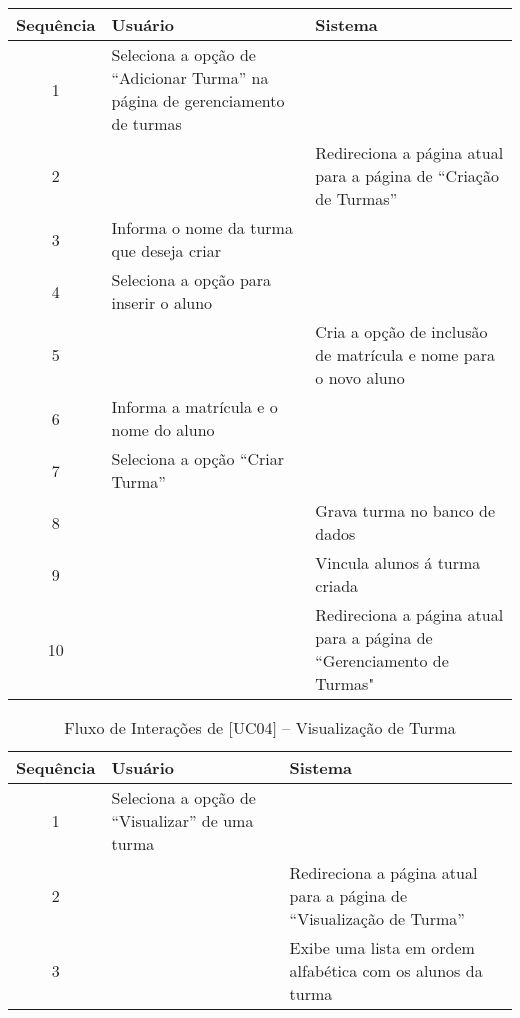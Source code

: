 \begin{itemize}
\begin{itemize}
\begin{table}[H]
\begin{tabular}{c|p{6cm}|p{6cm}}
                \textbf{Sequência} & \textbf{Usuário} & \textbf{Sistema} \\ %
                \hline                               %
                1 & Seleciona a opção de “Adicionar Turma” na página de gerenciamento de turmas  &  \\
                2 &   & Redireciona a página atual para a página de “Criação de Turmas”  \\
                3 & Informa o nome da turma que deseja criar &    \\
                4 & Seleciona a opção para inserir o aluno & \\ 
                5 & & Cria a opção de inclusão de matrícula e nome para o novo aluno \\
                6 & Informa a matrícula e o nome do aluno & \\
                7 & Seleciona a opção “Criar Turma” & \\
                8 & & Grava turma no banco de dados \\ 
                9 & & Vincula alunos á turma criada \\
                10 & & Redireciona a página atual para a página de “Gerenciamento de Turmas"
                \\
                \hline
            \end{tabular}
        \end{table}
        
        \begin{table}[H]
            \centering
            \caption{Fluxo de Interações de $[$UC04$]$ -- Visualização de Turma}
            \vspace{0.5cm}
            \renewcommand\arraystretch{1.5}
            \begin{tabular}{c|p{6cm}|p{6cm}}
             
                \textbf{Sequência} & \textbf{Usuário} & \textbf{Sistema} \\ %
                \hline                               %
                1 & Seleciona a opção de “Visualizar” de uma turma  &  \\
                2 & & Redireciona a página atual para a página de “Visualização de Turma” \\
                3 & & Exibe uma lista em ordem alfabética com os alunos da turma         %
                \\
                \hline
            \end{tabular}
        \end{table}
        

\end{itemize}
\end{itemize}
